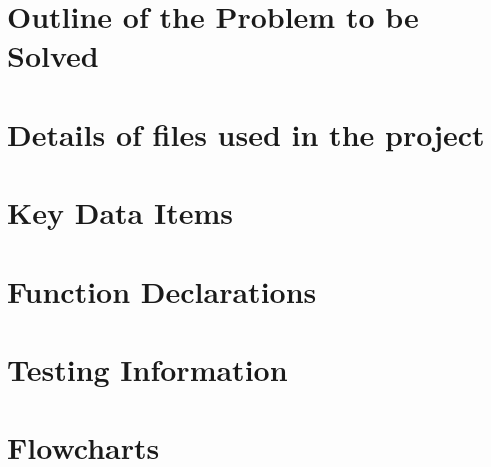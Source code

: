 \documentclass[11pt]{article}
\begin{document}

\pagebreak

\section{Outline of the Problem to be Solved}



\section{Details of files used in the project}



\section{Key Data Items}


\section{Function Declarations}


\section{Testing Information}


\section{Flowcharts}


\pagebreak
\end{document}

